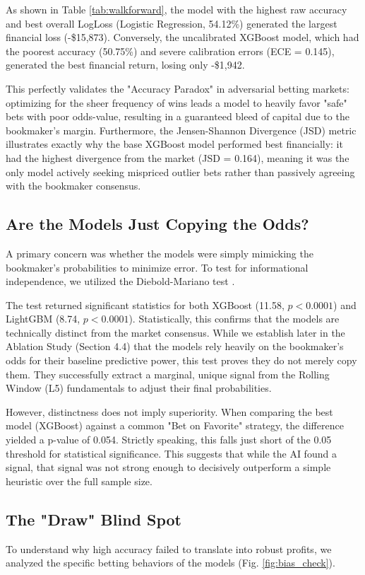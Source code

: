 \documentclass[pdflatex,sn-basic]{sn-jnl}
\begin{document}
As shown in Table \ref{tab:walkforward}, the model with the highest raw accuracy and best overall LogLoss (Logistic Regression, 54.12\%) generated the largest financial loss (-\$15,873). Conversely, the uncalibrated XGBoost model, which had the poorest accuracy (50.75\%) and severe calibration errors (ECE = 0.145), generated the best financial return, losing only -\$1,942. 

This perfectly validates the "Accuracy Paradox" in adversarial betting markets: optimizing for the sheer frequency of wins leads a model to heavily favor "safe" bets with poor odds-value, resulting in a guaranteed bleed of capital due to the bookmaker's margin. Furthermore, the Jensen-Shannon Divergence (JSD) metric illustrates exactly why the base XGBoost model performed best financially: it had the highest divergence from the market (JSD = 0.164), meaning it was the only model actively seeking mispriced outlier bets rather than passively agreeing with the bookmaker consensus.

\subsection{Are the Models Just Copying the Odds?}
A primary concern was whether the models were simply mimicking the bookmaker's probabilities to minimize error. To test for informational independence, we utilized the Diebold-Mariano test \cite{diebold1995}.

The test returned significant statistics for both XGBoost (11.58, $p < 0.0001$) and LightGBM (8.74, $p < 0.0001$). Statistically, this confirms that the models are technically distinct from the market consensus. While we establish later in the Ablation Study (Section 4.4) that the models rely heavily on the bookmaker's odds for their baseline predictive power, this test proves they do not merely copy them. They successfully extract a marginal, unique signal from the Rolling Window (L5) fundamentals to adjust their final probabilities.

However, distinctness does not imply superiority. When comparing the best model (XGBoost) against a common "Bet on Favorite" strategy, the difference yielded a p-value of 0.054. Strictly speaking, this falls just short of the 0.05 threshold for statistical significance. This suggests that while the AI found a signal, that signal was not strong enough to decisively outperform a simple heuristic over the full sample size.

\subsection{The "Draw" Blind Spot}
To understand why high accuracy failed to translate into robust profits, we analyzed the specific betting behaviors of the models (Fig. \ref{fig:bias_check}).
\end{document}
